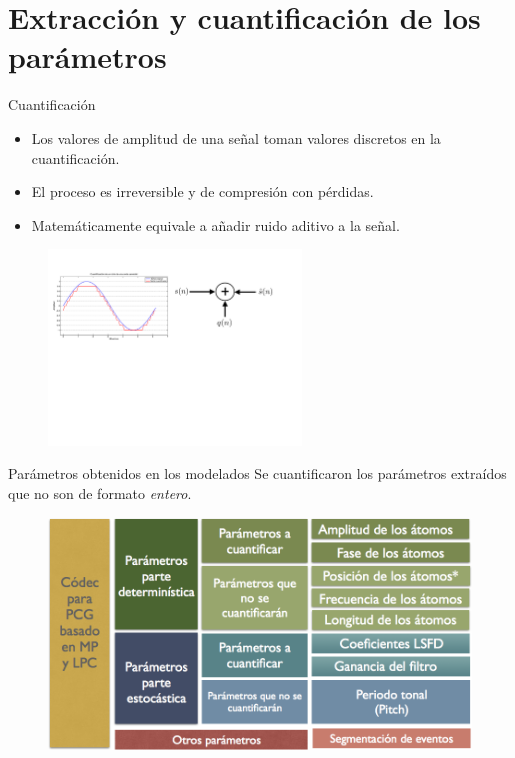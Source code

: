 \documentclass[xcolor=table]{beamer}
\begin{document}
\section{Extracci\'on y cuantificaci\'on de los par\'ametros}
\begin{frame}{Cuantificaci\'on}
	\begin{itemize}
		\item<2-> Los valores de amplitud de una se\~nal toman valores discretos en la cuantificaci\'on.
		\item<3-> El proceso es irreversible y de compresi\'on con p\'erdidas.
		\item<4-> Matem\'aticamente equivale a a\~nadir ruido aditivo a la se\~nal.
	\end{itemize}\pause
	\begin{figure}
		\centering
		\includegraphics[width=0.6\textwidth]{quant2.pdf}
	\end{figure}
\end{frame}
\begin{frame}{Par\'ametros obtenidos en los modelados}
Se cuantificaron los par\'ametros extra\'idos que no son de formato \emph{entero}.
	\begin{figure}
		\centering
		\includegraphics[scale=0.33]{params_cuant.png}
	\end{figure}
\end{frame}
\end{document}
